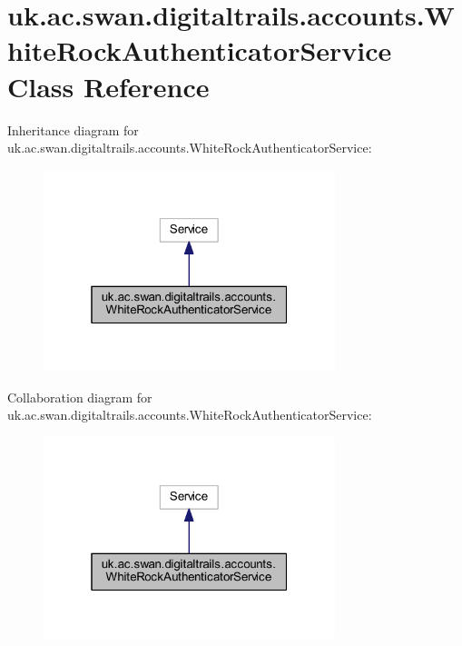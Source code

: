 \hypertarget{classuk_1_1ac_1_1swan_1_1digitaltrails_1_1accounts_1_1_white_rock_authenticator_service}{\section{uk.\+ac.\+swan.\+digitaltrails.\+accounts.\+White\+Rock\+Authenticator\+Service Class Reference}
\label{classuk_1_1ac_1_1swan_1_1digitaltrails_1_1accounts_1_1_white_rock_authenticator_service}
}


Inheritance diagram for uk.\+ac.\+swan.\+digitaltrails.\+accounts.\+White\+Rock\+Authenticator\+Service\+:\nopagebreak
\begin{figure}[H]
\begin{center}
\leavevmode
\includegraphics[width=241pt]{classuk_1_1ac_1_1swan_1_1digitaltrails_1_1accounts_1_1_white_rock_authenticator_service__inherit__graph}
\end{center}
\end{figure}


Collaboration diagram for uk.\+ac.\+swan.\+digitaltrails.\+accounts.\+White\+Rock\+Authenticator\+Service\+:\nopagebreak
\begin{figure}[H]
\begin{center}
\leavevmode
\includegraphics[width=241pt]{classuk_1_1ac_1_1swan_1_1digitaltrails_1_1accounts_1_1_white_rock_authenticator_service__coll__graph}
\end{center}
\end{figure}
